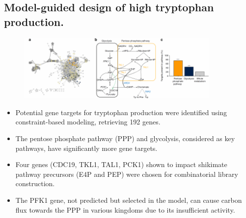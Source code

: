 \documentclass{beamer}
\begin{document}
\subsection{Model-guided design of high tryptophan production.}
\begin{frame}{}
	    \begin{figure}
		\centering
		\includegraphics[width=10cm]{pic/图片1.pdf}\\
 	    \end{figure}
    \begin{itemize} [<+-| alert@+>] %
        \item Potential gene targets for tryptophan production were identified using constraint-based modeling, retrieving 192 genes.
        \item The pentose phosphate pathway (PPP) and glycolysis, considered as key pathways, have significantly more gene targets.
        \item Four genes (CDC19, TKL1, TAL1, PCK1) shown to impact shikimate pathway precursors (E4P and PEP) were chosen for combinatorial library construction.
        \item The PFK1 gene, not predicted but selected in the model, can cause carbon flux towards the PPP in various kingdoms due to its insufficient activity.
        
    \end{itemize}  
      
\end{frame}
\end{document}
